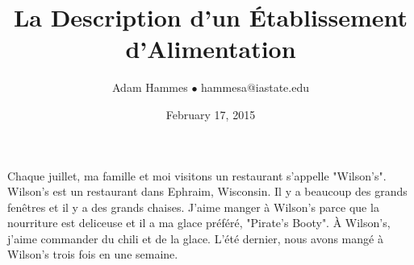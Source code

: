 \documentclass[11pt]{article}
\begin{document}
\title{La Description d'un Établissement d'Alimentation}
\author{Adam Hammes $\bullet$ hammesa@iastate.edu}
\date{February 17, 2015}
\maketitle

Chaque juillet, ma famille et moi visitons un restaurant s'appelle "Wilson's".
Wilson's est un restaurant dans Ephraim, Wisconsin.
Il y a beaucoup des grands fenêtres et il y a des grands chaises.
J'aime manger à Wilson's parce que la nourriture est deliceuse et il a ma glace préféré, "Pirate's Booty".
À Wilson's, j'aime commander du chili et de la glace.
L'été dernier, nous avons mangé à Wilson's trois fois en une semaine.
\end{document}
